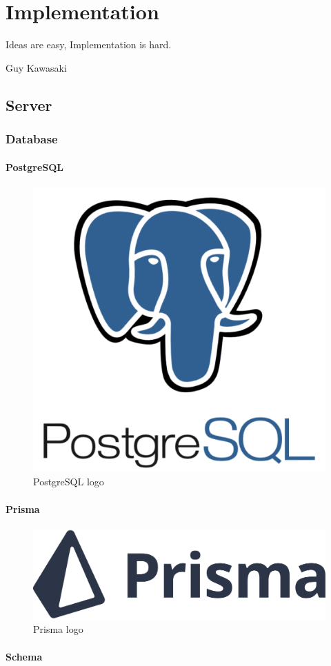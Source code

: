 \chapter{Implementation}
\label{cha:implementation}

\epigraph{Ideas are easy, Implementation is hard.}{Guy Kawasaki}

\section{Server}
\label{sec:implementation_server}

\subsection{Database}
\label{subsec:implementation_server_database}

\subsubsection{PostgreSQL}
\label{subsubsec:implementation_server_database_postgresql}

\begin{figure}
  \centering
  \includegraphics[width=.25\textwidth]{images/logos/postgresql.png}
  \caption{PostgreSQL logo}
\end{figure}

\subsubsection{Prisma}
\label{subsubsec:implementation_server_database_prisma}

\begin{figure}
  \centering
  \includegraphics[width=.25\textwidth]{images/logos/prisma.png}
  \caption{Prisma logo}
\end{figure}

\subsubsection{Schema}
\label{subsubsec:implementation_server_database_schema}

